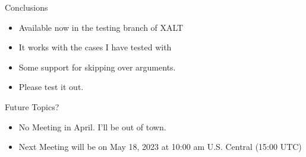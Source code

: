 \documentclass{beamer}
\begin{document}
\begin{frame}{Conclusions}
  \begin{itemize}
    \item Available now in the testing branch of XALT
    \item It works with the cases I have tested with
    \item Some support for skipping over arguments.
    \item Please test it out.
  \end{itemize}
\end{frame}

\begin{frame}{Future Topics?}
  \begin{itemize}
    \item No Meeting in April.  I'll be out of town.
    \item Next Meeting will be on May 18, 2023 at 10:00 am
      U.S. Central (15:00 UTC)
  \end{itemize}
\end{frame}

%
\end{document}

